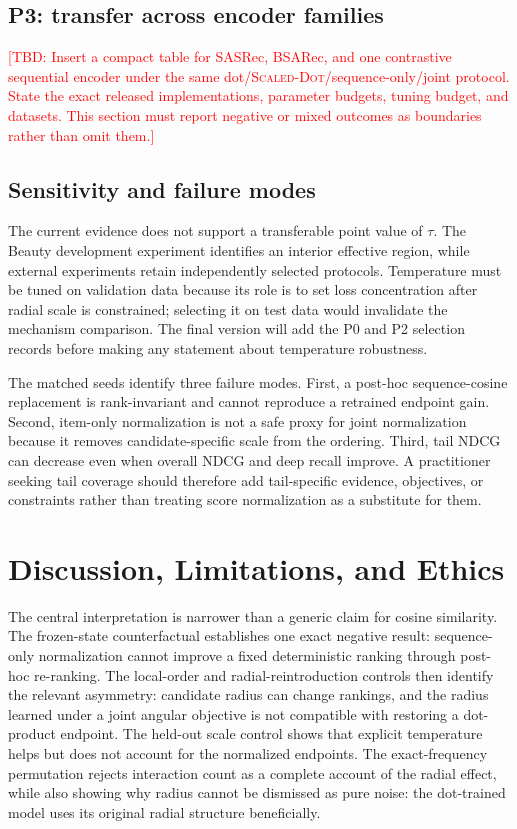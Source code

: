 \documentclass[sigconf,anonymous,review]{acmart}
\newcommand{\scaledot}{\textsc{Scaled-Dot}}
\newcommand{\TODO}[1]{\textcolor{red}{[TBD: #1]}}
\begin{document}
\subsection{P3: transfer across encoder families}
\TODO{Insert a compact table for SASRec, BSARec, and one contrastive sequential encoder under the same dot/\scaledot{}/sequence-only/joint protocol. State the exact released implementations, parameter budgets, tuning budget, and datasets. This section must report negative or mixed outcomes as boundaries rather than omit them.}

\subsection{Sensitivity and failure modes}
The current evidence does not support a transferable point value of $\tau$. The Beauty development experiment identifies an interior effective region, while external experiments retain independently selected protocols. Temperature must be tuned on validation data because its role is to set loss concentration after radial scale is constrained; selecting it on test data would invalidate the mechanism comparison. The final version will add the P0 and P2 selection records before making any statement about temperature robustness.

The matched seeds identify three failure modes. First, a post-hoc sequence-cosine replacement is rank-invariant and cannot reproduce a retrained endpoint gain. Second, item-only normalization is not a safe proxy for joint normalization because it removes candidate-specific scale from the ordering. Third, tail NDCG can decrease even when overall NDCG and deep recall improve. A practitioner seeking tail coverage should therefore add tail-specific evidence, objectives, or constraints rather than treating score normalization as a substitute for them.

\section{Discussion, Limitations, and Ethics}
The central interpretation is narrower than a generic claim for cosine similarity. The frozen-state counterfactual establishes one exact negative result: sequence-only normalization cannot improve a fixed deterministic ranking through post-hoc re-ranking. The local-order and radial-reintroduction controls then identify the relevant asymmetry: candidate radius can change rankings, and the radius learned under a joint angular objective is not compatible with restoring a dot-product endpoint. The held-out scale control shows that explicit temperature helps but does not account for the normalized endpoints. The exact-frequency permutation rejects interaction count as a complete account of the radial effect, while also showing why radius cannot be dismissed as pure noise: the dot-trained model uses its original radial structure beneficially.
\end{document}
